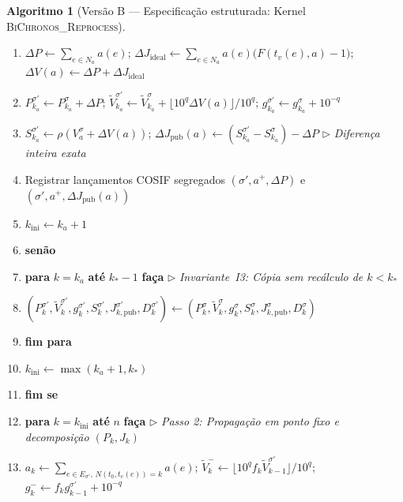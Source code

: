 \documentclass[11pt, a4paper]{article}
\theoremstyle{definition}
\newtheorem{algoritmo}[definicao]{Algoritmo}
\theoremstyle{plain}
\theoremstyle{remark}
\begin{document}
\begin{algoritmo}[Versão B — Especificação estruturada: Kernel \textsc{BiChronos\_Reprocess}]
\begin{enumerate}[label=\footnotesize\textbf{\arabic*:}, leftmargin=2.2em, itemsep=0.15em, topsep=0.3em]
    \item \hspace{1.2em} $\Delta P \leftarrow \sum_{e \in N_a} a(e)$; \quad $\Delta J_{\text{ideal}} \leftarrow \sum_{e \in N_a} a(e)\big(F(t_v(e), a) - 1\big)$; \quad $\Delta V(a) \leftarrow \Delta P + \Delta J_{\text{ideal}}$
    \item \hspace{1.2em} $P_{k_a}^{\sigma'} \leftarrow P_{k_a}^\sigma + \Delta P$; \quad $\tilde{V}_{k_a}^{\sigma'} \leftarrow \tilde{V}_{k_a}^\sigma + \lfloor 10^q \Delta V(a) \rfloor / 10^q$; \quad $g_{k_a}^{\sigma'} \leftarrow g_{k_a}^\sigma + 10^{-q}$
    \item \hspace{1.2em} $S_{k_a}^{\sigma'} \leftarrow \rho(V_a^\sigma + \Delta V(a))$; \quad $\Delta J_{\text{pub}}(a) \leftarrow (S_{k_a}^{\sigma'} - S_{k_a}^\sigma) - \Delta P$ \hfill $\triangleright$ \emph{Diferença inteira exata}
    \item \hspace{1.2em} Registrar lançamentos COSIF segregados $(\sigma', a^+, \Delta P)$ e $(\sigma', a^+, \Delta J_{\text{pub}}(a))$
    \item \hspace{1.2em} $k_{\text{ini}} \leftarrow k_a + 1$
    \item \textbf{senão}
    \item \hspace{1.2em} \textbf{para} $k = k_a$ \textbf{até} $k_* - 1$ \textbf{faça} \hfill $\triangleright$ \emph{Invariante~I3: Cópia sem recálculo de $k < k_*$}
    \item \hspace{2.4em} $(P_k^{\sigma'}, \tilde{V}_k^{\sigma'}, g_k^{\sigma'}, S_k^{\sigma'}, J_{k,\text{pub}}^{\sigma'}, D_k^{\sigma'}) \leftarrow (P_k^\sigma, \tilde{V}_k^\sigma, g_k^\sigma, S_k^\sigma, J_{k,\text{pub}}^\sigma, D_k^\sigma)$
    \item \hspace{1.2em} \textbf{fim para}
    \item \hspace{1.2em} $k_{\text{ini}} \leftarrow \max(k_a + 1, k_*)$
    \item \textbf{fim se}
    \item \textbf{para} $k = k_{\text{ini}}$ \textbf{até} $n$ \textbf{faça} \hfill $\triangleright$ \emph{Passo 2: Propagação em ponto fixo e decomposição $(P_k, J_k)$}
    \item \hspace{1.2em} $a_k \leftarrow \sum_{e \in E_{\sigma'},\, N(t_0, t_v(e)) = k} a(e)$; \quad $\tilde{V}_k^- \leftarrow \lfloor 10^q f_k \tilde{V}_{k-1}^{\sigma'} \rfloor / 10^q$; \quad $g_k^- \leftarrow f_k g_{k-1}^{\sigma'} + 10^{-q}$

\end{enumerate}
\end{algoritmo}
\end{document}
